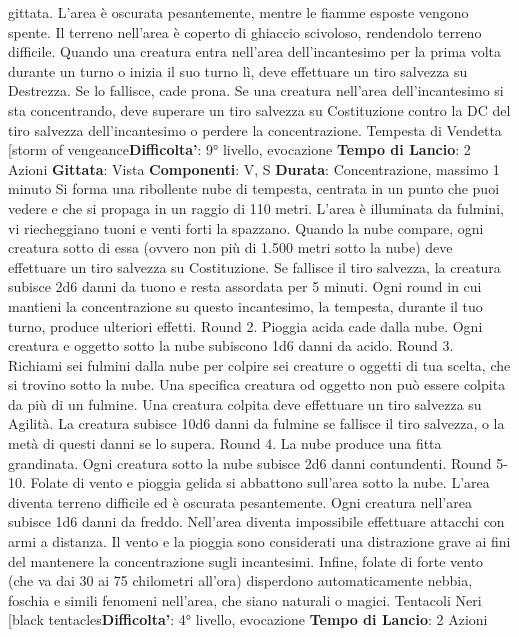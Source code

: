 \begin{multicols}{2}
gittata. L’area è oscurata pesantemente, mentre le
fiamme esposte vengono spente.
Il terreno nell’area è coperto di ghiaccio scivoloso,
rendendolo terreno difficile. Quando una creatura entra
nell’area dell’incantesimo per la prima volta durante un
turno o inizia il suo turno lì, deve effettuare un tiro
salvezza su Destrezza. Se lo fallisce, cade prona.
Se una creatura nell’area dell’incantesimo si sta
concentrando, deve superare un tiro salvezza su
Costituzione contro la DC del tiro salvezza
dell’incantesimo o perdere la concentrazione.
Tempesta di Vendetta
[storm of vengeance\textbf{Difficolta'}:
9° livello, evocazione
\textbf{Tempo di Lancio}: 2 Azioni
\textbf{Gittata}: Vista
\textbf{Componenti}: V, S
\textbf{Durata}: Concentrazione, massimo 1 minuto
Si forma una ribollente nube di tempesta, centrata in un
punto che puoi vedere e che si propaga in un raggio di
110 metri. L’area è illuminata da fulmini, vi riecheggiano
tuoni e venti forti la spazzano. Quando la nube
compare, ogni creatura sotto di essa (ovvero non più di
1.500 metri sotto la nube) deve effettuare un tiro
salvezza su Costituzione. Se fallisce il tiro salvezza, la
creatura subisce 2d6 danni da tuono e resta assordata
per 5 minuti.
Ogni round in cui mantieni la concentrazione su questo
incantesimo, la tempesta, durante il tuo turno, produce
ulteriori effetti.
Round 2. Pioggia acida cade dalla nube. Ogni creatura
e oggetto sotto la nube subiscono 1d6 danni da acido.
Round 3. Richiami sei fulmini dalla nube per colpire sei
creature o oggetti di tua scelta, che si trovino sotto la
nube. Una specifica creatura od oggetto non può
essere colpita da più di un fulmine. Una creatura colpita
deve effettuare un tiro salvezza su Agilità. La
creatura subisce 10d6 danni da fulmine se fallisce il tiro
salvezza, o la metà di questi danni se lo supera.
Round 4. La nube produce una fitta grandinata. Ogni
creatura sotto la nube subisce 2d6 danni contundenti.
Round 5-10. Folate di vento e pioggia gelida si
abbattono sull’area sotto la nube. L’area diventa terreno
difficile ed è oscurata pesantemente. Ogni creatura
nell’area subisce 1d6 danni da freddo. Nell’area diventa
impossibile effettuare attacchi con armi a distanza. Il
vento e la pioggia sono considerati una distrazione
grave ai fini del mantenere la concentrazione sugli
incantesimi. Infine, folate di forte vento (che va dai 30 ai
75 chilometri all’ora) disperdono automaticamente
nebbia, foschia e simili fenomeni nell’area, che siano
naturali o magici.
Tentacoli Neri
[black tentacles\textbf{Difficolta'}:
4° livello, evocazione
\textbf{Tempo di Lancio}: 2 Azioni

\end{multicols}
